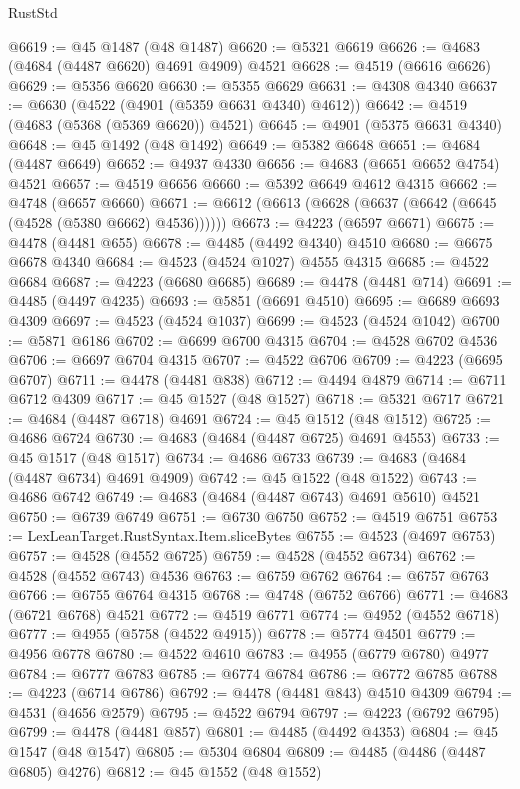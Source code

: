 \begin{lexlean}{RustStd}
\begin{coremodule}
@6619 := @45 @1487 (@48 @1487)
@6620 := @5321 @6619
@6626 := @4683 (@4684 (@4487 @6620) @4691 @4909) @4521
@6628 := @4519 (@6616 @6626)
@6629 := @5356 @6620
@6630 := @5355 @6629
@6631 := @4308 @4340
@6637 := @6630 (@4522 (@4901 (@5359 @6631 @4340) @4612))
@6642 := @4519 (@4683 (@5368 (@5369 @6620)) @4521)
@6645 := @4901 (@5375 @6631 @4340)
@6648 := @45 @1492 (@48 @1492)
@6649 := @5382 @6648
@6651 := @4684 (@4487 @6649)
@6652 := @4937 @4330
@6656 := @4683 (@6651 @6652 @4754) @4521
@6657 := @4519 @6656
@6660 := @5392 @6649 @4612 @4315
@6662 := @4748 (@6657 @6660)
@6671 := @6612 (@6613 (@6628 (@6637 (@6642 (@6645 (@4528 (@5380 @6662) @4536))))))
@6673 := @4223 (@6597 @6671)
@6675 := @4478 (@4481 @655)
@6678 := @4485 (@4492 @4340) @4510
@6680 := @6675 @6678 @4340
@6684 := @4523 (@4524 @1027) @4555 @4315
@6685 := @4522 @6684
@6687 := @4223 (@6680 @6685)
@6689 := @4478 (@4481 @714)
@6691 := @4485 (@4497 @4235)
@6693 := @5851 (@6691 @4510)
@6695 := @6689 @6693 @4309
@6697 := @4523 (@4524 @1037)
@6699 := @4523 (@4524 @1042)
@6700 := @5871 @6186
@6702 := @6699 @6700 @4315
@6704 := @4528 @6702 @4536
@6706 := @6697 @6704 @4315
@6707 := @4522 @6706
@6709 := @4223 (@6695 @6707)
@6711 := @4478 (@4481 @838)
@6712 := @4494 @4879
@6714 := @6711 @6712 @4309
@6717 := @45 @1527 (@48 @1527)
@6718 := @5321 @6717
@6721 := @4684 (@4487 @6718) @4691
@6724 := @45 @1512 (@48 @1512)
@6725 := @4686 @6724
@6730 := @4683 (@4684 (@4487 @6725) @4691 @4553)
@6733 := @45 @1517 (@48 @1517)
@6734 := @4686 @6733
@6739 := @4683 (@4684 (@4487 @6734) @4691 @4909)
@6742 := @45 @1522 (@48 @1522)
@6743 := @4686 @6742
@6749 := @4683 (@4684 (@4487 @6743) @4691 @5610) @4521
@6750 := @6739 @6749
@6751 := @6730 @6750
@6752 := @4519 @6751
@6753 := LexLeanTarget.RustSyntax.Item.sliceBytes
@6755 := @4523 (@4697 @6753)
@6757 := @4528 (@4552 @6725)
@6759 := @4528 (@4552 @6734)
@6762 := @4528 (@4552 @6743) @4536
@6763 := @6759 @6762
@6764 := @6757 @6763
@6766 := @6755 @6764 @4315
@6768 := @4748 (@6752 @6766)
@6771 := @4683 (@6721 @6768) @4521
@6772 := @4519 @6771
@6774 := @4952 (@4552 @6718)
@6777 := @4955 (@5758 (@4522 @4915))
@6778 := @5774 @4501
@6779 := @4956 @6778
@6780 := @4522 @4610
@6783 := @4955 (@6779 @6780) @4977
@6784 := @6777 @6783
@6785 := @6774 @6784
@6786 := @6772 @6785
@6788 := @4223 (@6714 @6786)
@6792 := @4478 (@4481 @843) @4510 @4309
@6794 := @4531 (@4656 @2579)
@6795 := @4522 @6794
@6797 := @4223 (@6792 @6795)
@6799 := @4478 (@4481 @857)
@6801 := @4485 (@4492 @4353)
@6804 := @45 @1547 (@48 @1547)
@6805 := @5304 @6804
@6809 := @4485 (@4486 (@4487 @6805) @4276)
@6812 := @45 @1552 (@48 @1552)

\end{coremodule}
\end{lexlean}
